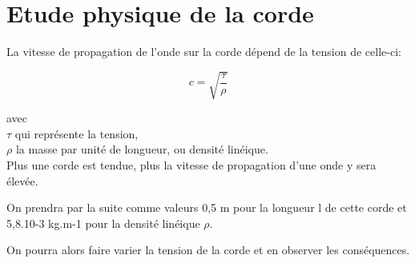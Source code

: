 \section{Etude physique de la corde}

La vitesse de propagation de l'onde sur la corde dépend de la tension de celle-ci:

\begin{equation*}
c = \sqrt{\frac{\tau}{\rho}}
\end{equation*}

avec \\
\hspace*{2cm} $\tau$ qui représente la tension, \\
\hspace*{2cm} $\rho$ la masse par unité de longueur, ou densité linéique.\\

Plus une corde est tendue, plus la vitesse de propagation d’une onde y sera élevée.\

On prendra par la suite comme valeurs 0,5 m pour la longueur l de cette corde et 5,8.10-3 kg.m-1 pour la densité linéique $\rho$.\

On pourra alors faire varier la tension de la corde et en observer les conséquences.


